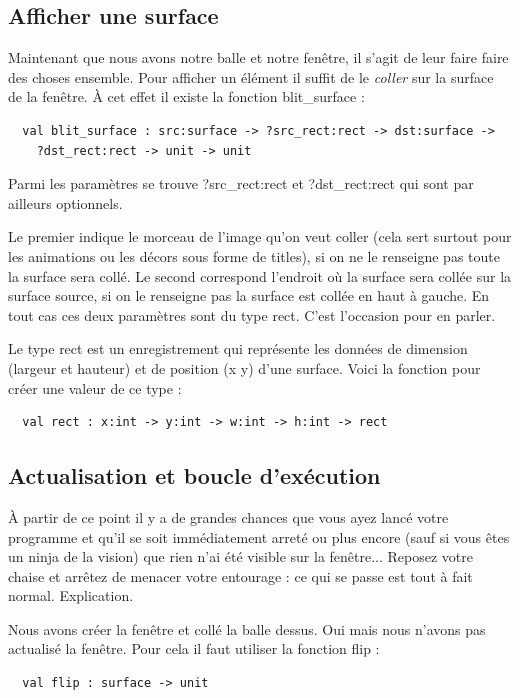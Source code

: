 \documentclass[a4paper]{article}
\begin{document}
\subsection{Afficher une surface}
Maintenant que nous avons notre balle et notre fenêtre, il s'agit de leur faire faire des choses ensemble. Pour afficher un élément il suffit de le \textit{coller} sur la surface de la fenêtre. À cet effet il existe la fonction blit\_surface :

\begin{lstlisting}
  val blit_surface : src:surface -> ?src_rect:rect -> dst:surface -> 
    ?dst_rect:rect -> unit -> unit
\end{lstlisting}

Parmi les paramètres se trouve ?src\_rect:rect et ?dst\_rect:rect qui sont par ailleurs optionnels.\par
Le premier indique le morceau de l'image qu'on veut coller (cela sert surtout pour les animations ou les décors sous forme de titles), si on ne le renseigne pas toute la surface sera collé. Le second correspond l'endroit où la surface sera collée sur la surface source, si on le renseigne pas la surface est collée en haut à gauche. En tout cas ces deux paramètres sont du type rect. C'est l'occasion pour en parler.\bigskip

Le type rect est un enregistrement qui représente les données de dimension (largeur et hauteur) et de position (x y) d'une surface. Voici la fonction pour créer une valeur de ce type :

\begin{lstlisting}
  val rect : x:int -> y:int -> w:int -> h:int -> rect
\end{lstlisting}

\subsection{Actualisation et boucle d'exécution}
À partir de ce point il y a de grandes chances que vous ayez lancé votre programme et qu'il se soit immédiatement arreté ou plus encore (sauf si vous êtes un ninja de la vision) que rien n'ai été visible sur la fenêtre... Reposez votre chaise et arrêtez de menacer votre entourage : ce qui se passe est tout à fait normal. Explication.\par
Nous avons créer la fenêtre et collé la balle dessus. Oui mais nous n'avons pas actualisé la fenêtre. Pour cela il faut utiliser la fonction flip :

\begin{lstlisting}
  val flip : surface -> unit
\end{lstlisting}
\end{document}
